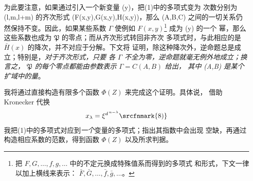 为此要注意，如果通过引入一个新变量 (y)，把(1)中的多项式变为
次数分别为 (l,m,l+m) 的齐次形式 (F(x,y),G(x,y),H(x,y))，那么
 (A,B,C) 之间的一切关系仍然保持不变。因此，如果某些系数
\(\Gamma\) 使例如 \(F(x,y)\)\footnote{把
\(F,G,\ldots,f,g,\ldots\) 中的不定元换成特殊值系而得到的多项式
和形式，下文一律以加上横线来表示：
\(\bar F,\bar G,\ldots,\bar f,\bar g,\ldots\)。} 成为 (y) 的一个
幂，那么这些系数也成为 \(\mathfrak P\) 的零点；而从齐次形式转回非齐次
多项式时，与此相应的是 \(\bar H(x)\) 的降次，并不对应于分解。下文将
证明，除这种降次外，逆命题总是成立；特别是，\emph{对于齐次形式，只要
各 \(\Gamma\) 不全为零，逆命题就毫无例外地成立；换言之，
\(\mathfrak P\) 的每个零点都能由参数表示 \(\Gamma=C(A,B)\) 给出，
其中 (A,B) 是某个扩域中的量}。
\addtocounter{footnote}{1}

我将通过直接构造有限多个函数 \(\Phi(Z)\) 来完成这个证明。具体说，
借助 Kronecker 代换
\[
 x_\lambda=\xi^{d^{\,n-\lambda}}\text{\srcfnmark{8)}}
\]
我把(1)中的多项式对应到\emph{一个}变量的多项式；指出其指数中会出现
空缺，再通过构造相应系数的范数，得到函数 \(\Phi(Z)\) 以及所求判据。

\addtocounter{footnote}{1}
